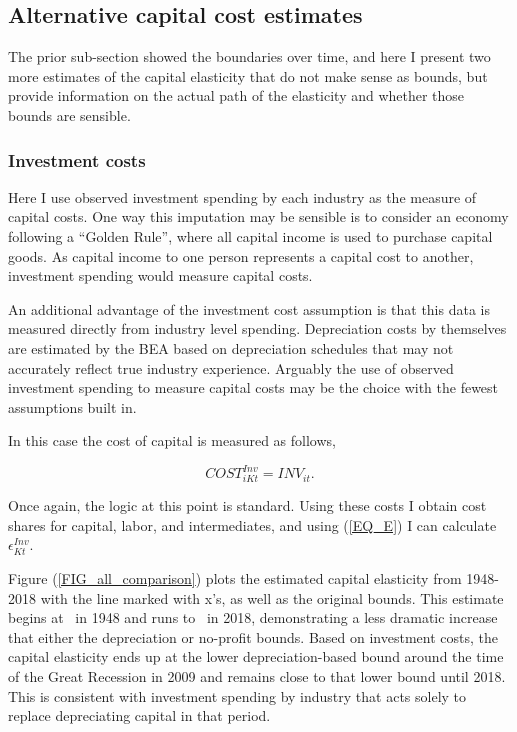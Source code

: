 \documentclass[11pt]{article}
\begin{document}
\subsection{Alternative capital cost estimates}
The prior sub-section showed the boundaries over time, and here I present two more estimates of the capital elasticity that do not make sense as bounds, but provide information on the actual path of the elasticity and whether those bounds are sensible.

\subsubsection{Investment costs}
Here I use observed investment spending by each industry as the measure of capital costs. One way this imputation may be sensible is to consider an economy following a ``Golden Rule'', where all capital income is used to purchase capital goods. As capital income to one person represents a capital cost to another, investment spending would measure capital costs.

An additional advantage of the investment cost assumption is that this data is measured directly from industry level spending. Depreciation costs by themselves are estimated by the BEA based on depreciation schedules that may not accurately reflect true industry experience. Arguably the use of observed investment spending to measure capital costs may be the choice with the fewest assumptions built in.

In this case the cost of capital is measured as follows,

\begin{equation}
	COST^{Inv}_{iKt} = INV_{it}. 
\end{equation}

Once again, the logic at this point is standard. Using these costs I obtain cost shares for capital, labor, and intermediates, and using (\ref{EQ_E}) I can calculate $\epsilon_{Kt}^{Inv}$. 

Figure (\ref{FIG_all_comparison}) plots the estimated capital elasticity from 1948-2018 with the line marked with x's, as well as the original bounds. This estimate begins at \basefirstinv \ in 1948 and runs to \baselastinv \ in 2018, demonstrating a less dramatic increase that either the depreciation or no-profit bounds. Based on investment costs, the capital elasticity ends up at the lower depreciation-based bound around the time of the Great Recession in 2009 and remains close to that lower bound until 2018. This is consistent with investment spending by industry that acts solely to replace depreciating capital in that period.
\end{document}
